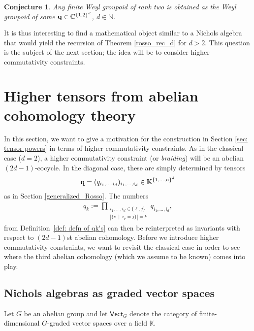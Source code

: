 \documentclass[pdftex]{sigma}
\numberwithin{equation}{section}
\newtheorem{conje}[Theorem]{Conjecture}
\newcommand{\NN }{\mathbb{N}}
\newcommand{\CC }{\mathbb{C}}
\newcommand{\qq }{{\bf q}}
\newcommand{\KK }{\mathbb{K}}
\newcommand{\dn }{d}
\begin{document}
\begin{conje}
Any finite Weyl groupoid of rank two is obtained as the Weyl groupoid of some $\qq\in \CC^{\{1,2\}^\dn}$, $\dn\in\NN$.
\end{conje}

It is thus interesting to find a mathematical object similar to a Nichols algebra that would yield the recursion
of Theorem \ref{rosso_rec_d}
for $\dn>2$. This question is the subject of the next section; the idea will be to consider higher commutativity constraints.

\section{Higher tensors from abelian cohomology theory}\label{ab_coh}

In this section, we want to give a motivation for the construction in Section \ref{sec: tensor powers} in terms of higher commutativity constraints. As in the classical case ($d=2$), a higher commutativity constraint (or \textit{braiding}) will be an abelian $(2d-1)$-cocycle. In the diagonal case, these are simply determined by tensors
\[\qq = (q_{i_1,\dots,i_\dn})_{i_1,\dots,i_\dn}\in \KK^{\{1,\dots,n\}^\dn}\]
as in Section \ref{generalized_Rosso}. The numbers
\begin{align*}
 q_k :=\prod_{\substack{i_1,\dots,i_\dn\in\{\ell,j\}\\ |\{\nu\:\mid\: i_\nu=j\}|=k}} q_{i_1,\dots,i_\dn},
\end{align*}
from Definition~\ref{def: defn of qk's} can then be reinterpreted as invariants with respect to $(2d-1)$st abelian cohomology. Before we introduce higher commutativity constraints, we want to revisit the classical case in order to see where the third abelian cohomology (which we assume to be known) comes into play.

\subsection{Nichols algebras as graded vector spaces}

Let $G$ be an abelian group and let $\mathsf{Vect}_G$ denote the category of finite-dimensional $G$-graded vector spaces over a field $\KK$.
\end{document}
